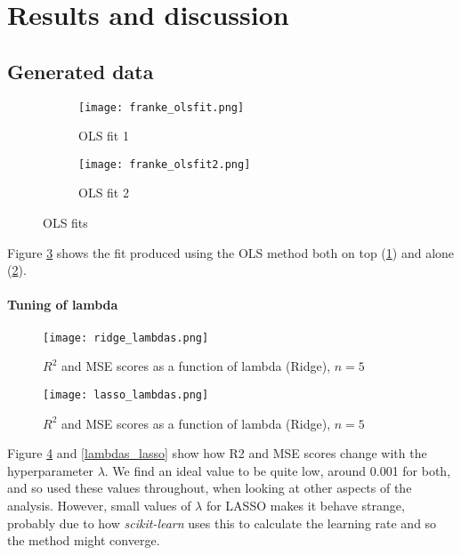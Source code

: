 \documentclass[a4paper]{article}
\begin{document}
\section{Results and discussion}

\subsection{Generated data}

\begin{figure}[ht]
\centering
\begin{subfigure}{.5\textwidth}
  \centering
  \texttt{[image: franke\_olsfit.png]}
  \caption{OLS fit 1}
  \label{fig:olsfit1}
\end{subfigure}%
\begin{subfigure}{.5\textwidth}
  \centering
  \texttt{[image: franke\_olsfit2.png]}
  \caption{OLS fit 2}
  \label{fig:olsfit2}
\end{subfigure}
\caption{OLS fits}
\label{fig:olsfits}
\end{figure}

Figure \ref{fig:olsfits} shows the fit produced using the OLS method both on top (\ref{fig:olsfit1}) and alone (\ref{fig:olsfit2}).

\paragraph{Tuning of lambda}

\begin{figure}[h!]
\centering
  \texttt{[image: ridge\_lambdas.png]}
  \caption{$R^{2}$ and MSE scores as a function of lambda (Ridge), $n = 5$}
  \label{fig:lambdas_ridge}
\end{figure}

\begin{figure}[h!]
\centering
  \texttt{[image: lasso\_lambdas.png]}
  \caption{$R^{2}$ and MSE scores as a function of lambda (Ridge), $n = 5$}
  \label{fig:lambdas_lasso}
\end{figure}

Figure \ref{fig:lambdas_ridge} and \ref{lambdas_lasso} show how R2 and MSE scores change with the hyperparameter $\lambda$. We find an ideal value to be quite low, around 0.001 for both, and so used these values throughout, when looking at other aspects of the analysis. However, small values of $\lambda$ for LASSO makes it behave strange, probably due to how \textit{scikit-learn} uses this to calculate the learning rate and so the method might converge.
\end{document}
